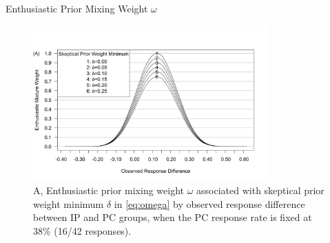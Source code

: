 \documentclass{beamer}
\begin{document}
%
%

\begin{frame}{Enthusiastic Prior Mixing Weight $\omega$}
\begin{figure}[htbp]
\begin{center}
\includegraphics[width=0.8\textwidth]{./figures/3-part-compatibility-2.png}
    \caption{A, Enthusiastic prior mixing weight $\omega$ associated with skeptical prior weight minimum $\delta$ in \eqref{eq:omega} by observed response difference between IP and PC groups, when the PC response rate is fixed at $38\%$ (16/42 responses).}
\label{fig:ex2varyomega}
 \end{center}
\end{figure}
\end{frame}

\end{document}
